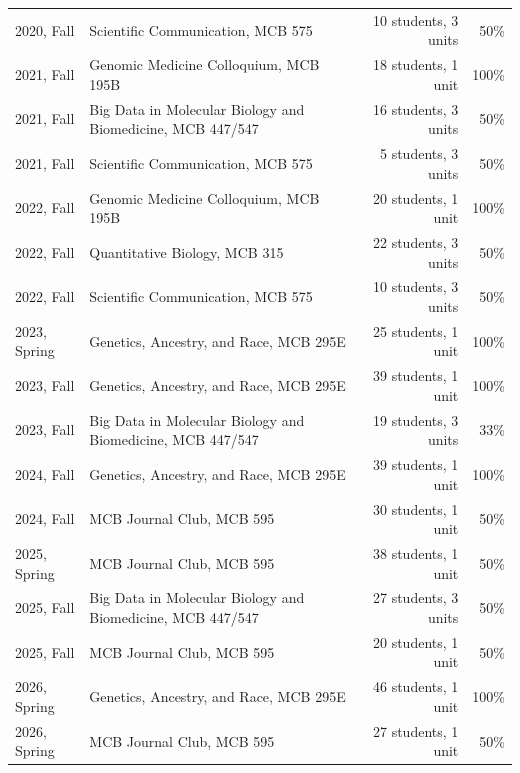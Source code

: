 \documentclass[11pt]{article}
\begin{document}
\begin{longtable}[l]{l l r r}
2020, Fall & Scientific Communication, MCB 575 & 10 students, 3 units & 50\%\\
2021, Fall & Genomic Medicine Colloquium, MCB 195B & 18 students, 1 unit& 100\%\\
2021, Fall & Big Data in Molecular Biology and Biomedicine, MCB 447/547 & 16 students, 3 units & 50\%\\
2021, Fall & Scientific Communication, MCB 575 & 5 students, 3 units & 50\%\\
2022, Fall & Genomic Medicine Colloquium, MCB 195B & 20 students, 1 unit& 100\%\\
2022, Fall & Quantitative Biology, MCB 315 & 22 students, 3 units & 50\%\\
2022, Fall & Scientific Communication, MCB 575 & 10 students, 3 units & 50\%\\
2023, Spring & Genetics, Ancestry, and Race, MCB 295E & 25 students, 1 unit & 100\%\\
2023, Fall & Genetics, Ancestry, and Race, MCB 295E & 39 students, 1 unit & 100\%\\
2023, Fall & Big Data in Molecular Biology and Biomedicine, MCB 447/547 & 19 students, 3 units & 33\%\\
2024, Fall & Genetics, Ancestry, and Race, MCB 295E & 39 students, 1 unit & 100\%\\
2024, Fall & MCB Journal Club, MCB 595 & 30 students, 1 unit & 50\%\\
2025, Spring & MCB Journal Club, MCB 595 & 38 students, 1 unit & 50\%\\
2025, Fall & Big Data in Molecular Biology and Biomedicine, MCB 447/547 & 27 students, 3 units & 50\%\\
2025, Fall & MCB Journal Club, MCB 595 & 20 students, 1 unit & 50\%\\
2026, Spring & Genetics, Ancestry, and Race, MCB 295E & 46 students, 1 unit & 100\%\\
2026, Spring  & MCB Journal Club, MCB 595 & 27 students, 1 unit & 50\%\\
\end{longtable}
\end{document}
